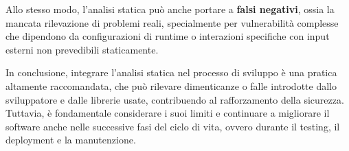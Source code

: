 Allo stesso modo, l'analisi statica può anche portare a \textbf{falsi negativi},
ossia la mancata rilevazione di problemi reali, specialmente per vulnerabilità
complesse che dipendono da configurazioni di runtime o interazioni specifiche
con input esterni non prevedibili staticamente.

In conclusione, integrare l'analisi statica nel processo di sviluppo è una pratica
altamente raccomandata, che può rilevare dimenticanze o falle introdotte dallo
sviluppatore e dalle librerie usate, contribuendo al rafforzamento della sicurezza.
Tuttavia, è fondamentale considerare i suoi limiti e continuare a migliorare il software
anche nelle successive fasi del ciclo di vita, ovvero durante il testing, il deployment
e la manutenzione.